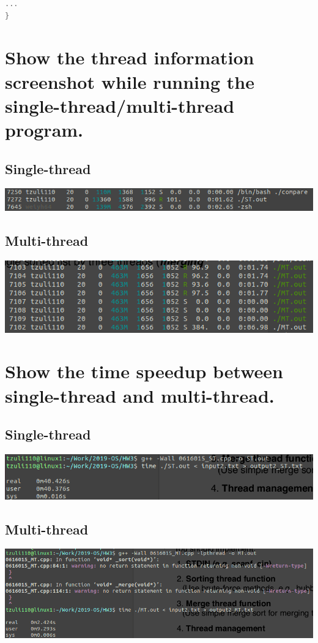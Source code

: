 \documentclass[12pt, a4paper]{article}
\begin{document}
\begin{CJK*}{UTF8}{bsmi}
\begin{lstlisting}[language=C++]
    ...
}
\end{lstlisting}

    \section{Show the thread information screenshot while running the single-thread/multi-thread program.}
        \subsection{Single-thread}
            \includegraphics{st_threads.png}
        \subsection{Multi-thread}
            \includegraphics{mt_threads.png}


    \section{Show the time speedup between single-thread and multi-thread.}
        \subsection{Single-thread}
            \includegraphics{st_time.png}
        \subsection{Multi-thread}
            \includegraphics{mt_time.png}


\end{CJK*}
\end{document}
